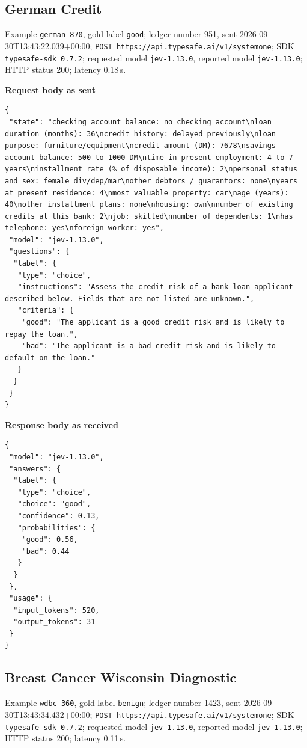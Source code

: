 \subsection*{German Credit}
Example \texttt{german-870}, gold label \texttt{good}; ledger number 951, sent 2026-09-30T13:\allowbreak{}43:\allowbreak{}22.039+00:\allowbreak{}00; \texttt{POST https://api.typesafe.ai/\allowbreak{}v1/\allowbreak{}systemone}; SDK \texttt{typesafe-sdk 0.7.2}; requested model \texttt{jev-1.13.0}, reported model \texttt{jev-1.13.0}; HTTP status 200; latency 0.18\,s.

\noindent\textbf{Request body as sent}
\begin{lstlisting}
{
 "state": "checking account balance: no checking account\nloan duration (months): 36\ncredit history: delayed previously\nloan purpose: furniture/equipment\ncredit amount (DM): 7678\nsavings account balance: 500 to 1000 DM\ntime in present employment: 4 to 7 years\ninstallment rate (% of disposable income): 2\npersonal status and sex: female div/dep/mar\nother debtors / guarantors: none\nyears at present residence: 4\nmost valuable property: car\nage (years): 40\nother installment plans: none\nhousing: own\nnumber of existing credits at this bank: 2\njob: skilled\nnumber of dependents: 1\nhas telephone: yes\nforeign worker: yes",
 "model": "jev-1.13.0",
 "questions": {
  "label": {
   "type": "choice",
   "instructions": "Assess the credit risk of a bank loan applicant described below. Fields that are not listed are unknown.",
   "criteria": {
    "good": "The applicant is a good credit risk and is likely to repay the loan.",
    "bad": "The applicant is a bad credit risk and is likely to default on the loan."
   }
  }
 }
}
\end{lstlisting}
\noindent\textbf{Response body as received}
\begin{lstlisting}
{
 "model": "jev-1.13.0",
 "answers": {
  "label": {
   "type": "choice",
   "choice": "good",
   "confidence": 0.13,
   "probabilities": {
    "good": 0.56,
    "bad": 0.44
   }
  }
 },
 "usage": {
  "input_tokens": 520,
  "output_tokens": 31
 }
}
\end{lstlisting}

\subsection*{Breast Cancer Wisconsin Diagnostic}
Example \texttt{wdbc-360}, gold label \texttt{benign}; ledger number 1423, sent 2026-09-30T13:\allowbreak{}43:\allowbreak{}34.432+00:\allowbreak{}00; \texttt{POST https://api.typesafe.ai/\allowbreak{}v1/\allowbreak{}systemone}; SDK \texttt{typesafe-sdk 0.7.2}; requested model \texttt{jev-1.13.0}, reported model \texttt{jev-1.13.0}; HTTP status 200; latency 0.11\,s.

